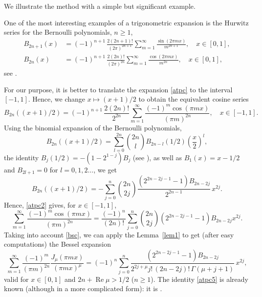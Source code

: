 \documentclass[12pt,leqno]{amsart}
\numberwithin{equation}{section}
\theoremstyle{plain}
\renewcommand{\Re}{\operatorname{Re}}
\begin{document}
We illustrate the method with a simple but significant example.

One of the most interesting examples of a trigonometric expansion is the Hurwitz
series for the Bernoulli polynomials, $n\ge 1$,
\begin{align}
\nonumber%
   B_{2n+1}(x) &= (-1)^{n+1} \, \frac{2(2n+1)!}{(2\pi)^{2n+1}}
   \sum_{m=1}^{\infty} \frac{\sin(2\pi mx)}{m^{2n+1}},
   \quad x\in [0,1],\\
\label{atpc}
   B_{2n}(x) &= (-1)^{n+1} \, \frac{2(2n)!}{(2\pi)^{2n}}
   \sum_{m=1}^{\infty} \frac{\cos(2\pi mx)}{m^{2n}},
   \quad x\in [0,1],
\end{align}
see \cite[24.8(i)]{Dil-NIST}.

For our purpose, it is better to translate the expansion \eqref{atpc} to the interval $[-1,1]$. Hence, we change $x \mapsto (x+1)/2$ to obtain the equivalent cosine series
\begin{equation}
\label{atpc2}
B_{2n}((x+1)/2) = (-1)^{n+1} \, \frac{2(2n)!}{2^{2n}}
   \sum_{m=1}^{\infty} \frac{(-1)^m\cos(\pi mx)}{(\pi m)^{2n}},
   \quad x\in [-1,1].
\end{equation}
Using the binomial expansion of the Bernoulli polynomials,
\[
  B_{2n}((x+1)/2) = \sum_{l=0}^{2n} \binom{2n}{l} B_{2n-l}({1}/2) \left(\frac{x}2\right)^l,
\]
the identity $B_j(1/2) = -(1-2^{1-j})B_j$ (see \cite[24.4.27]{Dil-NIST}), as well as $B_1(x) = x-1/2$ and $B_{2l+1} = 0$ for $l=0,1,2\dots$, we get
\begin{equation*}
B_{2n}((x+1)/2) = - \sum_{j=0}^{n} \binom{2n}{2j}
\frac{(2^{2n-2j-1}-1)B_{2n-2j}}{2^{2n-1}} \,x^{2j}.
\end{equation*}
Hence, \eqref{atpc2} gives, for $x\in [-1,1]$,
\begin{equation*}
\sum_{m=1}^{\infty} \frac{(-1)^m\cos(\pi mx)}{(\pi m)^{2n}}
= \frac{(-1)^{n}}{(2n)!} \sum_{j=0}^{n} \binom{2n}{2j}(2^{2n-2j-1}-1)B_{2n-2j}x^{2j}.
\end{equation*}
Taking into account \eqref{bsc}, we can apply the Lemma~\ref{lem1} to get (after easy computations) the Bessel expansion
\begin{equation}
\label{atpc5}
\sum_{m=1}^{\infty} \frac{(-1)^m}{(\pi m)^{2n}}
\frac{J_\mu(\pi mx)}{(\pi mx)^\mu}
= (-1)^{n} \sum_{j=0}^{n} \frac{(2^{2n-2j-1}-1)B_{2n-2j}}{2^{2j+\mu}j!\,(2n-2j)!\,\Gamma(\mu+j+1)} \,x^{2j},
\end{equation}
valid for $x\in[0,1]$ and $2n+\Re \mu>1/2$ ($n\ge 1$).
The identity \eqref{atpc5} is already known (although in a more complicated form): it is \cite[p.~678, (14)]{PBM1}.
\end{document}
